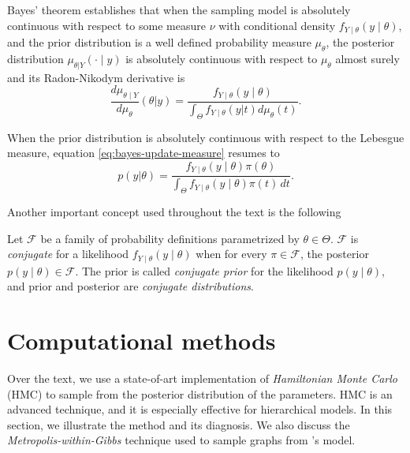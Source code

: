 Bayes' theorem establishes that when the sampling model is absolutely
continuous with respect to some measure $\nu$ with conditional density
$f_{Y\mid \theta}(y\mid\theta)$, and the prior distribution is a
well defined probability measure $\mu_{\theta}$, the posterior distribution
$\mu_{\theta|Y}(\cdot\mid y)$ is
absolutely continuous with respect to $\mu_{\theta}$ almost surely and its
Radon-Nikodym derivative is \cite[p. 16]{schervish2012theory}
\begin{equation}
  \label{eq:bayes-update-measure}
  \frac{d\mu_{\theta\mid Y}}{d\mu_{\theta}}(\theta|y) = \frac{f_{Y\mid \theta}(y\mid \theta)}{\int_{\Theta} f_{Y\mid\theta}(y|t)d\mu_{\theta}(t)}.  
\end{equation}

When the prior distribution is absolutely continuous with respect to the
Lebesgue measure, equation \eqref{eq:bayes-update-measure} resumes to 
\begin{equation}
  p(y|\theta) = \frac{f_{Y\mid \theta}(y\mid \theta)\pi(\theta)}{\int_{\Theta} f_{Y\mid \theta}(y\mid \theta)\pi(t) \, dt}.  
\end{equation}

Another important concept used throughout the text is the following 

\begin{definition}
  \label{def:conjugate-family}
  Let $\mathcal{F}$ be a family of probability definitions parametrized by
  $\theta \in \Theta$. $\mathcal{F}$ is {\em conjugate} for a likelihood $f_{Y
  \mid \theta}(y
  \mid \theta)$ when for every $\pi \in \mathcal{F}$, the posterior $p(y \mid
  \theta) \in \mathcal{F}$. The prior is called {\em conjugate prior} for the
  likelihood $p(y \mid \theta)$, and prior and posterior are {\em conjugate
  distributions}. 
\end{definition}

\section{Computational methods}
\label{sec:computational_methods}

Over the text, we use a state-of-art implementation of {\em Hamiltonian Monte
Carlo} (HMC) to sample from the posterior distribution of the parameters. HMC
is an advanced technique, and it is especially effective for hierarchical
models. In this section, we illustrate the method and its diagnosis. We also
discuss the {\em Metropolis-within-Gibbs} technique used to sample graphs from
\textcite{crawford2016}'s model.

